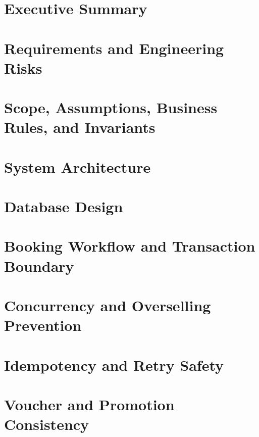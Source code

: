 \documentclass[a4paper,12pt,oneside]{report}
\begin{document}


\setcounter{tocdepth}{1}
\tableofcontents
\clearpage


\chapter{Executive Summary}


\chapter{Requirements and Engineering Risks}


\chapter{Scope, Assumptions, Business Rules, and Invariants}


\chapter{System Architecture}


\chapter{Database Design}


\chapter{Booking Workflow and Transaction Boundary}


\chapter{Concurrency and Overselling Prevention}


\chapter{Idempotency and Retry Safety}


\chapter{Voucher and Promotion Consistency}

\end{document}
